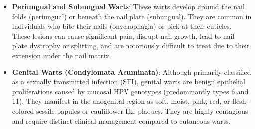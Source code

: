 \begin{itemize}
    \item \textbf{Periungual and Subungual Warts}: These warts develop around the nail folds (periungual) or beneath the nail plate (subungual). They are common in individuals who bite their nails (onychophagia) or pick at their cuticles. These lesions can cause significant pain, disrupt nail growth, lead to nail plate dystrophy or splitting, and are notoriously difficult to treat due to their extension under the nail matrix.
    \item \textbf{Genital Warts (Condylomata Acuminata)}: Although primarily classified as a sexually transmitted infection (STI), genital warts are benign epithelial proliferations caused by mucosal HPV genotypes (predominantly types 6 and 11). They manifest in the anogenital region as soft, moist, pink, red, or flesh-colored sessile papules or cauliflower-like plaques. They are highly contagious and require distinct clinical management compared to cutaneous warts.
\end{itemize}

